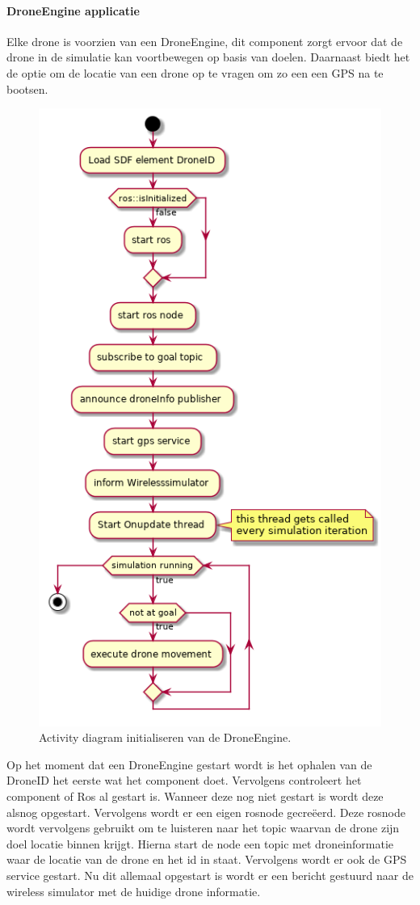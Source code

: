 \documentclass[a4paper, 11pt, oneside]{report}
\begin{document}
\paragraph{DroneEngine applicatie}
\label{DetailedDesign:MeshNetwerk:Activity:initaliserenDrone}
Elke drone is voorzien van een DroneEngine, dit component zorgt ervoor dat de drone in de simulatie kan voortbewegen op basis van doelen.
Daarnaast biedt het de optie om de locatie van een drone op te vragen om zo een een GPS na te bootsen.
\begin{figure}[H]
	\begin{center}\includegraphics[width=.45\linewidth]{UML/out/DroneSimulation/Activity/DroneEngine/DroneEngine.png}\end{center}
	\caption{Activity diagram initialiseren van de DroneEngine.}
	\label{fig:communication:MeshNetwerk:Activity:initialiserenDroneEngine}
\end{figure}

Op het moment dat een DroneEngine gestart wordt is het ophalen van de DroneID  het eerste wat het component doet.
Vervolgens controleert het component of Ros al gestart is.
Wanneer deze nog niet gestart is wordt deze alsnog opgestart.
Vervolgens wordt er een eigen rosnode gecreëerd.
Deze rosnode wordt vervolgens gebruikt om te luisteren naar het topic waarvan de drone zijn doel locatie binnen krijgt.
Hierna start de node een topic met droneinformatie waar de locatie van de drone en het id in staat.
Vervolgens wordt er ook de GPS service gestart.
Nu dit allemaal opgestart is wordt er een bericht gestuurd naar de wireless simulator met de huidige drone informatie.
\end{document}
